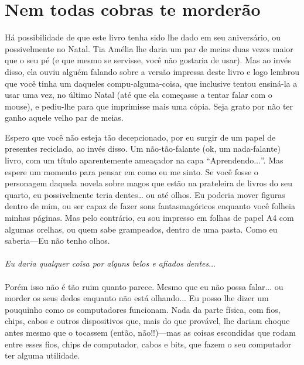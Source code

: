 

\chapter{Nem todas cobras te morderão}\label{ch:notallsnakeswillsquishyou}

Há possibilidade de que este livro tenha sido lhe dado em seu aniversário, ou possivelmente no Natal. Tia Amélia lhe daria um par de meias duas vezes maior que o seu pé (e que mesmo se servisse, você não gostaria de usar). Mas ao invés disso, ela ouviu alguém falando sobre a versão impressa deste livro e logo lembrou que você tinha um daqueles compu-alguma-coisa, que inclusive tentou ensiná-la a usar uma vez, no último Natal (até que ela começasse a tentar falar com o mouse), e pediu-lhe para que imprimisse mais uma cópia. Seja grato por não ter ganho aquele velho par de meias.

Espero que você não esteja tão decepcionado, por eu surgir de um papel de presentes reciclado, ao invés disso. Um não-tão-falante (ok, um nada-falante) livro, com um título aparentemente ameaçador na capa ``Aprendendo$\ldots$''.
Mas espere um momento para pensar em como eu me sinto. Se você fosse o personagem daquela novela sobre magos que estão na prateleira de livros do seu quarto, eu possivelmente teria dentes… ou até olhos. Eu poderia mover figuras dentro de mim, ou ser capaz de fazer sons fantasmagóricos enquanto você folheia minhas páginas. Mas pelo contrário, eu sou impresso em folhas de papel A4 com algumas orelhas, ou quem sabe grampeados, dentro de uma pasta. Como eu saberia---Eu não tenho olhos.
\\
\\
\emph{Eu daria qualquer coisa por alguns belos e afiados dentes$\ldots$}
\\
\\
Porém isso não é tão ruim quanto parece. Mesmo que eu não possa falar... ou morder os seus dedos enquanto não está olhando... Eu posso lhe dizer um pouquinho como os computadores funcionam. Nada da parte física, com fios, chips, cabos e outros dispositivos que, mais do que provável, lhe dariam choque antes mesmo que o tocassem (então, não!!)---mas as coisas escondidas que rodam entre esses fios, chips de computador, cabos e bits, que fazem o seu computador ter alguma utilidade.

